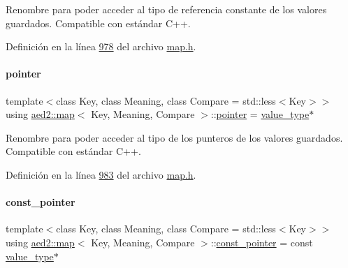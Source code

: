 Renombre para poder acceder al tipo de referencia constante de los valores guardados. Compatible con estándar C++. 



Definición en la línea \hyperlink{map_8h_source_l00978}{978} del archivo \hyperlink{map_8h_source}{map.\+h}.

\mbox{\label{classaed2_1_1map_a7394e98a23b86bc008ad73326b273fd5_a7394e98a23b86bc008ad73326b273fd5}} 
\paragraph{\texorpdfstring{pointer}{pointer}}
{\footnotesize\ttfamily template$<$class Key, class Meaning, class Compare = std\+::less$<$\+Key$>$$>$ \\
using \hyperlink{classaed2_1_1map}{aed2\+::map}$<$ Key, Meaning, Compare $>$\+::\hyperlink{classaed2_1_1map_a7394e98a23b86bc008ad73326b273fd5_a7394e98a23b86bc008ad73326b273fd5}{pointer} =  \hyperlink{classaed2_1_1map_a719db98e0ff9a837610f76be33264680_a719db98e0ff9a837610f76be33264680}{value\+\_\+type}$\ast$}



Renombre para poder acceder al tipo de los punteros de los valores guardados. Compatible con estándar C++. 



Definición en la línea \hyperlink{map_8h_source_l00983}{983} del archivo \hyperlink{map_8h_source}{map.\+h}.

\mbox{\label{classaed2_1_1map_a1366fc3e227a49777cb748fc6d4e022b_a1366fc3e227a49777cb748fc6d4e022b}} 
\paragraph{\texorpdfstring{const\+\_\+pointer}{const\_pointer}}
{\footnotesize\ttfamily template$<$class Key, class Meaning, class Compare = std\+::less$<$\+Key$>$$>$ \\
using \hyperlink{classaed2_1_1map}{aed2\+::map}$<$ Key, Meaning, Compare $>$\+::\hyperlink{classaed2_1_1map_a1366fc3e227a49777cb748fc6d4e022b_a1366fc3e227a49777cb748fc6d4e022b}{const\+\_\+pointer} =  const \hyperlink{classaed2_1_1map_a719db98e0ff9a837610f76be33264680_a719db98e0ff9a837610f76be33264680}{value\+\_\+type}$\ast$}



